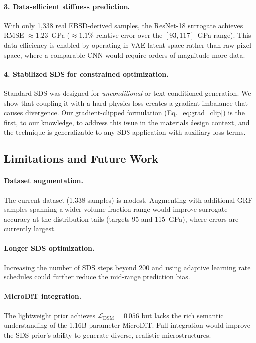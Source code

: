 \documentclass[12pt,a4paper]{article}
\newcommand{\loss}{\mathcal{L}}
\theoremstyle{definition}
\begin{document}
\paragraph{3. Data-efficient stiffness prediction.}
With only 1{,}338 real EBSD-derived samples, the ResNet-18 surrogate
achieves RMSE $\approx 1.23$~GPa ($\approx 1.1\%$ relative error over
the $[93, 117]$~GPa range).  This data efficiency is enabled by
operating in VAE latent space rather than raw pixel space, where a
comparable CNN would require orders of magnitude more data.

\paragraph{4. Stabilized SDS for constrained optimization.}
Standard SDS was designed for \emph{unconditional} or text-conditioned
generation.  We show that coupling it with a hard physics loss creates a
gradient imbalance that causes divergence.  Our gradient-clipped
formulation (Eq.~\ref{eq:grad_clip}) is the first, to our knowledge, to
address this issue in the materials design context, and the technique is
generalizable to any SDS application with auxiliary loss terms.

\subsection{Limitations and Future Work}

\paragraph{Dataset augmentation.}
The current dataset (1{,}338 samples) is modest.  Augmenting with
additional GRF samples spanning a wider volume fraction range would
improve surrogate accuracy at the distribution tails (targets 95 and
115~GPa), where errors are currently largest.

\paragraph{Longer SDS optimization.}
Increasing the number of SDS steps beyond 200 and using adaptive
learning rate schedules could further reduce the mid-range
prediction bias.

\paragraph{MicroDiT integration.}
The lightweight prior achieves $\loss_{\mathrm{DSM}} = 0.056$ but lacks
the rich semantic understanding of the 1.16B-parameter MicroDiT.
Full integration would improve the SDS prior's ability to generate
diverse, realistic microstructures.
\end{document}
